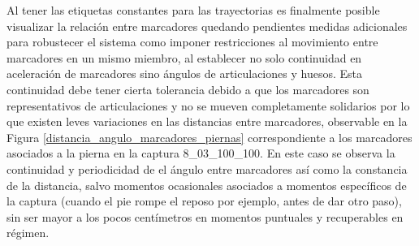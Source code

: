 Al tener las etiquetas constantes para las trayectorias es finalmente posible visualizar la relación entre marcadores quedando pendientes medidas adicionales para robustecer el sistema como imponer restricciones al movimiento entre marcadores en un mismo miembro, al establecer no solo continuidad en aceleración de marcadores sino ángulos de articulaciones y huesos. Esta continuidad debe tener cierta tolerancia debido a que los marcadores son representativos de articulaciones y no se mueven completamente solidarios por lo que existen leves variaciones en las distancias entre marcadores, observable en la Figura \ref{distancia_angulo_marcadores_piernas} correspondiente a los marcadores asociados a la pierna en la captura 8\_03\_100\_100. En este caso se observa la continuidad y periodicidad de el ángulo entre marcadores así como la constancia de la distancia, salvo momentos ocasionales asociados a momentos específicos de la captura (cuando el pie rompe el reposo por ejemplo, antes de dar otro paso), sin ser mayor a los pocos centímetros en momentos puntuales y recuperables en régimen.

